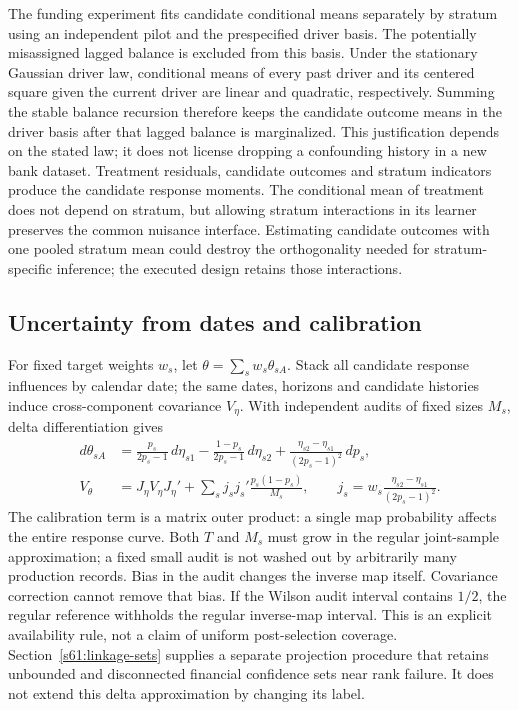 The funding experiment fits candidate conditional means separately by
stratum using an independent pilot and the prespecified driver basis.
The potentially misassigned lagged balance is excluded from this basis.
Under the stationary Gaussian driver law, conditional means of every past
driver and its centered square given the current driver are linear and
quadratic, respectively. Summing the stable balance recursion therefore
keeps the candidate outcome means in the driver basis after that lagged
balance is marginalized. This justification depends on the stated law;
it does not license dropping a confounding history in a new bank dataset.
Treatment residuals, candidate outcomes and stratum indicators produce
the candidate response moments. The conditional mean of treatment does
not depend on stratum, but allowing stratum interactions in its learner
preserves the common nuisance interface. Estimating candidate outcomes with
one pooled stratum mean could destroy the orthogonality needed for
stratum-specific inference; the executed design retains those interactions.

\subsection{Uncertainty from dates and calibration}
For fixed target weights $w_s$, let
$\theta=\sum_sw_s\theta_{sA}$. Stack all candidate response influences by
calendar date; the same dates, horizons and candidate histories induce
cross-component covariance $V_\eta$. With independent audits of fixed sizes
$M_s$, delta differentiation gives
\begin{align}
 d\theta_{sA}
 &=\frac{p_s}{2p_s-1}\,d\eta_{s1}
   -\frac{1-p_s}{2p_s-1}\,d\eta_{s2}
   +\frac{\eta_{s2}-\eta_{s1}}{(2p_s-1)^2}\,dp_s,\nonumber\\
 V_\theta
 &=J_\eta V_\eta J_\eta'
   +\sum_s j_sj_s'\frac{p_s(1-p_s)}{M_s},\qquad
 j_s=w_s\frac{\eta_{s2}-\eta_{s1}}{(2p_s-1)^2}.
 \label{s6:linkage-variance}
\end{align}
The calibration term is a matrix outer product: a single map probability
affects the entire response curve. Both $T$ and $M_s$ must grow in the
regular joint-sample approximation; a fixed small audit is not washed out
by arbitrarily many production records. Bias in the audit changes the
inverse map itself. Covariance correction cannot remove that bias.
If the Wilson audit interval contains $1/2$, the regular reference withholds the
regular inverse-map interval. This is an explicit availability rule, not
a claim of uniform post-selection coverage.
Section~\ref{s61:linkage-sets} supplies a separate projection procedure that
retains unbounded and disconnected financial confidence sets near rank
failure. It does not extend this delta approximation by changing its label.


